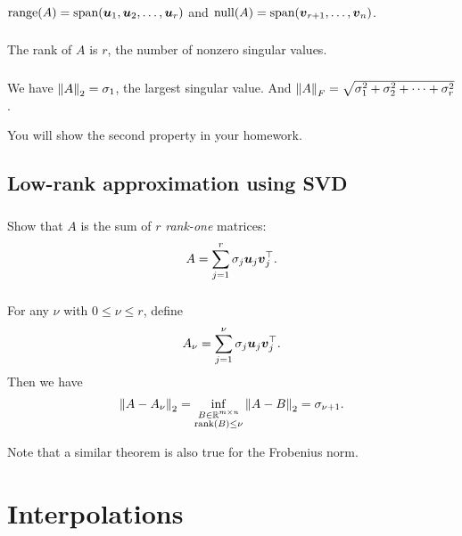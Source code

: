 \documentclass[11pt,letterpaper]{report}
\begin{document}
\subsection{}
$\text{range}(A) = \text{span}(\boldsymbol{u}_1,\boldsymbol{u}_2,\dots,\boldsymbol{u}_r)$ and $\text{null}(A) = \text{span}(\boldsymbol{v}_{r+1},\dots,\boldsymbol{v}_n)$. 

\subsection{}
The rank of $A$ is $r$, the number of nonzero singular values.

\subsection{}
We have $\left\Vert A \right\Vert_2 = \sigma_1$, the largest singular value. And $\left\Vert A \right\Vert_F = \sqrt{\sigma_1^2+\sigma_2^2+\dots+\sigma_r^2}$. 

You will show the second property in your homework.

\section{Low-rank approximation using SVD}
\subsection{}
Show that $A$ is the sum of $r$ \emph{rank-one} matrices:
\begin{align*}
    A = \sum_{j=1}^r \sigma_j \boldsymbol{u}_j \boldsymbol{v}_j^\top.
\end{align*}

\subsection{}
For any $\nu$ with $0\leq \nu \leq r$, define
\begin{align*}
    A_\nu = \sum_{j=1}^\nu \sigma_j \boldsymbol{u}_j \boldsymbol{v}_j^\top.
\end{align*}
Then we have
\begin{align*}
    \left\Vert A-A_\nu \right\Vert_2 = \inf_{\substack{B\in\mathbb{R}^{m\times n}\\\text{rank}(B)\leq\nu}}\left\Vert A-B \right\Vert_2 = \sigma_{\nu+1}.
\end{align*}

Note that a similar theorem is also true for the Frobenius norm.
\chapter{Interpolations}
\end{document}
